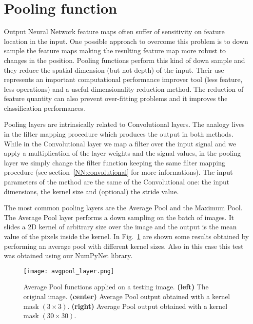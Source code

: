 \documentclass{standalone}
\begin{document}
\section[Pooling function]{Pooling function}\label{NN:pooling}

Output Neural Network feature maps often suffer of sensitivity on feature location in the input.
One possible approach to overcome this problem is to down sample the feature maps making the resulting feature map more robust to changes in the position.
Pooling functions perform this kind of down sample and they reduce the spatial dimension (but not depth) of the input.
Their use represents an important computational performance improver tool (less feature, less operations) and a useful dimensionality reduction method.
The reduction of feature quantity can also prevent over-fitting problems and it improves the classification performances.

Pooling layers are intrinsically related to Convolutional layers.
The analogy lives in the filter mapping procedure which produces the output in both methods.
While in the Convolutional layer we map a filter over the input signal and we apply a multiplication of the layer weights and the signal values, in the pooling layer we simply change the filter function keeping the same filter mapping procedure (see section~\ref{NN:convolutional} for more informations).
The input parameters of the method are the same of the Convolutional one: the input dimensions, the kernel size and (optional) the stride value.

The most common pooling layers are the Average Pool and the Maximum Pool.
The Average Pool layer performs a down sampling on the batch of images.
It slides a 2D kernel of arbitrary size over the image and the output is the mean value of the pixels inside the kernel.
In Fig.~\ref{fig:avgpool} are shown some results obtained by performing an average pool with different kernel sizes.
Also in this case this test was obtained using our NumPyNet library.

\begin{center}
\begin{figure}[htbp]
\centering
\texttt{[image: avgpool\_layer.png]}
\caption{Average Pool functions applied on a testing image.
\textbf{(left)} The original image.
\textbf{(center)} Average Pool output obtained with a kernel mask $(3\times 3)$.
\textbf{(right)} Average Pool output obtained with a kernel mask $(30\times 30)$.
}
\label{fig:avgpool}
\end{figure}
\end{center}
\end{document}
